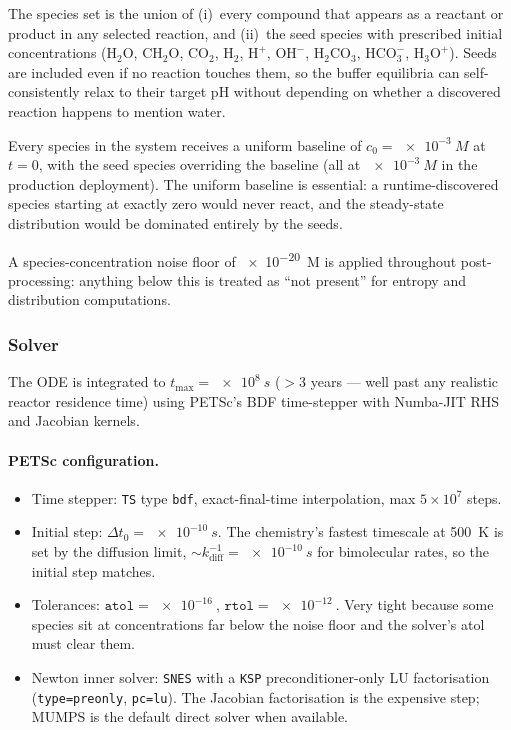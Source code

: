 The species set is the union of (i)~every compound that appears as a reactant or product in any selected reaction, and (ii)~the seed species with prescribed initial concentrations ($\mathrm{H_2O}$, $\mathrm{CH_2O}$, $\mathrm{CO_2}$, $\mathrm{H_2}$, $\mathrm{H^+}$, $\mathrm{OH^-}$, $\mathrm{H_2CO_3}$, $\mathrm{HCO_3^-}$, $\mathrm{H_3O^+}$). Seeds are included even if no reaction touches them, so the buffer equilibria can self-consistently relax to their target pH without depending on whether a discovered reaction happens to mention water.

Every species in the system receives a uniform baseline of $c_0 = \SI{e-3}{M}$ at $t = 0$, with the seed species overriding the baseline (all at $\SI{e-3}{M}$ in the production deployment). The uniform baseline is essential: a runtime-discovered species starting at exactly zero would never react, and the steady-state distribution would be dominated entirely by the seeds.

A species-concentration noise floor of \SI{e-20}{M} is applied throughout post-processing: anything below this is treated as ``not present'' for entropy and distribution computations.

\subsubsection{Solver}
\label{sec:kinetics-solver}

The ODE is integrated to $t_\text{max} = \SI{e8}{s}$ ($> 3$ years --- well past any realistic reactor residence time) using PETSc's BDF time-stepper with Numba-JIT RHS and Jacobian kernels.

\paragraph{PETSc configuration.}
\begin{itemize}
    \item Time stepper: \texttt{TS} type \texttt{bdf}, exact-final-time interpolation, max $5\times 10^7$ steps.
    \item Initial step: $\Delta t_0 = \SI{e-10}{s}$. The chemistry's fastest timescale at \SI{500}{K} is set by the diffusion limit, $\sim k_\text{diff}^{-1} = \SI{e-10}{s}$ for bimolecular rates, so the initial step matches.
    \item Tolerances: $\texttt{atol} = \SI{e-16}{}$, $\texttt{rtol} = \SI{e-12}{}$. Very tight because some species sit at concentrations far below the noise floor and the solver's atol must clear them.
    \item Newton inner solver: \texttt{SNES} with a \texttt{KSP} preconditioner-only LU factorisation (\texttt{type=preonly}, \texttt{pc=lu}). The Jacobian factorisation is the expensive step; MUMPS is the default direct solver when available.
\end{itemize}

